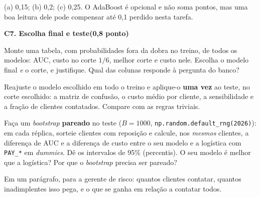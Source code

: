 \documentclass[11pt,a4paper]{article}
\newcommand{\tarefa}[3]{%
  \bigskip\par\noindent
  {\large\bfseries\color{azulufrj}#1. #2}\hfill{\bfseries(#3)}\par
  \nopagebreak\vspace{0.3em}}
\newcommand{\cod}[1]{\texttt{#1}}
\begin{document}
\begin{criterio}
(a) 0,15; (b) 0,2; (c) 0,25. O AdaBoost é opcional e não soma pontos, mas uma boa
leitura dele pode compensar até 0,1 perdido nesta tarefa.
\end{criterio}

\tarefa{C7}{Escolha final e teste}{0,8 ponto}

\begin{itens}
  \item Monte uma tabela, com probabilidades fora da dobra no treino, de todos os
        modelos: AUC, custo no corte $1/6$, melhor corte e custo nele. Escolha o modelo final \emph{e} o corte, e justifique. Qual das
        colunas responde à pergunta do banco?
  \item Reajuste o modelo escolhido em todo o treino e aplique-o \textbf{uma vez} ao
        teste, no corte escolhido: a matriz de confusão, o custo médio por cliente, a
        sensibilidade e a fração de clientes contatados. Compare com as regras
        triviais.
  \item Faça um \emph{bootstrap} \textbf{pareado} no teste ($B=1000$,
        \cod{np.random.default\_rng(2026)}): em cada réplica, sorteie clientes com
        reposição e calcule, nos \emph{mesmos} clientes, a diferença de AUC e a
        diferença de custo entre o seu modelo e a logística com \cod{PAY\_*} em
        \emph{dummies}. Dê os intervalos de 95\% (percentis). O seu modelo é
        melhor que a logística? Por que o \emph{bootstrap} precisa ser pareado?
  \item Em um parágrafo, para a gerente de risco: quantos clientes contatar, quantos
        inadimplentes isso pega, e o que se ganha em relação a contatar todos.
\end{itens}
\end{document}
